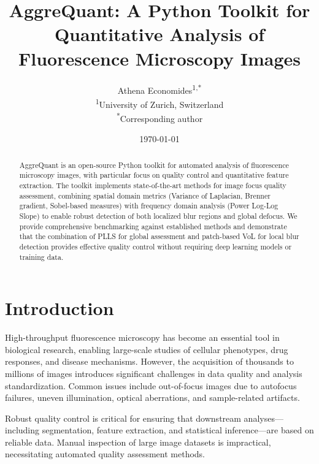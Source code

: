 \documentclass[11pt,a4paper]{article}
\title{AggreQuant: A Python Toolkit for Quantitative Analysis of \\
       Fluorescence Microscopy Images}
\author{
    Athena Economides\textsuperscript{1,*} \\[1em]
    \textsuperscript{1}University of Zurich, Switzerland \\
    \textsuperscript{*}Corresponding author
}
\date{\today}
\begin{document}

\maketitle

\begin{abstract}
AggreQuant is an open-source Python toolkit for automated analysis of fluorescence microscopy images, with particular focus on quality control and quantitative feature extraction. The toolkit implements state-of-the-art methods for image focus quality assessment, combining spatial domain metrics (Variance of Laplacian, Brenner gradient, Sobel-based measures) with frequency domain analysis (Power Log-Log Slope) to enable robust detection of both localized blur regions and global defocus. We provide comprehensive benchmarking against established methods and demonstrate that the combination of PLLS for global assessment and patch-based VoL for local blur detection provides effective quality control without requiring deep learning models or training data.
\end{abstract}

\section{Introduction}
\label{sec:introduction}


High-throughput fluorescence microscopy has become an essential tool in biological research, enabling large-scale studies of cellular phenotypes, drug responses, and disease mechanisms. However, the acquisition of thousands to millions of images introduces significant challenges in data quality and analysis standardization. Common issues include out-of-focus images due to autofocus failures, uneven illumination, optical aberrations, and sample-related artifacts.

Robust quality control is critical for ensuring that downstream analyses---including segmentation, feature extraction, and statistical inference---are based on reliable data. Manual inspection of large image datasets is impractical, necessitating automated quality assessment methods.
\end{document}
